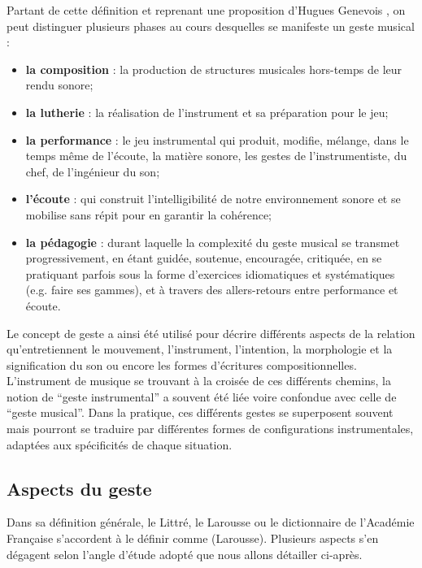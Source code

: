 \indent Partant de cette définition et reprenant une proposition d'Hugues Genevois \cite{genevois_geste_1999}, on peut distinguer plusieurs phases au cours desquelles se manifeste un geste musical :
\vspace{-1em}
\begin{itemize}[noitemsep]
\item \textbf{la composition} : la production de structures musicales hors-temps de leur rendu sonore;
\item \textbf{la lutherie} : la réalisation de l'instrument et sa préparation pour le jeu;
\item \textbf{la performance} : le jeu instrumental qui produit, modifie, mélange, dans le temps même de l'écoute, la matière sonore, les gestes de l'instrumentiste, du chef, de l'ingénieur du son;
\item \textbf{l'écoute} : qui construit l'intelligibilité de notre environnement sonore et se mobilise sans répit pour en garantir la cohérence;
\item \textbf{la pédagogie} : durant laquelle la complexité du geste musical se transmet progressivement, en étant guidée, soutenue, encouragée, critiquée, en se pratiquant parfois sous la forme d'exercices idiomatiques et systématiques (e.g. faire ses gammes), et à travers des allers-retours entre performance et écoute.
\end{itemize}
\noindent Le concept de geste a ainsi été utilisé pour décrire différents aspects de la relation qu'entretiennent le mouvement, l'instrument, l'intention, la morphologie et la signification du son ou encore les formes d'écritures compositionnelles. L'instrument de musique se trouvant à la croisée de ces différents chemins, la notion de ``geste instrumental'' a souvent été liée voire confondue avec celle de ``geste musical''. Dans la pratique, ces différents gestes se superposent souvent mais pourront se traduire par différentes formes de configurations instrumentales, adaptées aux spécificités de chaque situation.

\subsection{Aspects du geste}

\noindent Dans sa définition générale, le Littré, le Larousse ou le dictionnaire de l'Académie Française s'accordent à le définir comme  (Larousse). Plusieurs aspects s'en dégagent selon l'angle d'étude adopté que nous allons détailler ci-après.

